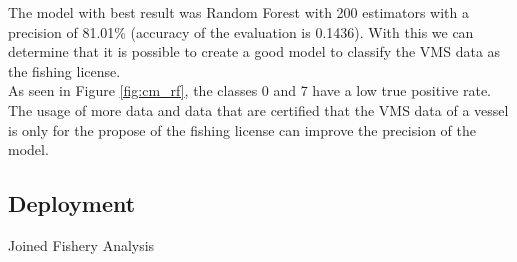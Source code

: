 \newpage
The model with best result was Random Forest with 200 estimators with a precision of 81.01\% (accuracy of the evaluation is 0.1436).
With this we can determine that it is possible to create a good model to classify the VMS data as the fishing license. \\
As seen in Figure \ref{fig:cm_rf}, the classes 0 and 7 have a low true positive rate. The usage of more data and data that are certified that the VMS data of a vessel is only for the propose of the fishing license can improve the precision of the model.





\subsection{Deployment} %
\label{sub:deployment}
Joined Fishery Analysis









